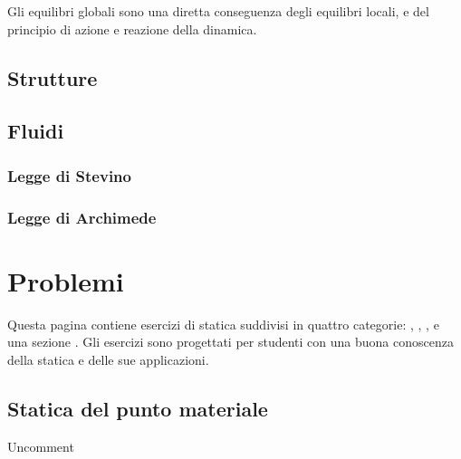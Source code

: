 \documentclass[letterpaper,10pt,italian]{jupyterBook}
\begin{document}
\sphinxAtStartPar
Gli equilibri globali sono una diretta conseguenza degli equilibri locali, e del principio di azione e reazione della dinamica.


\subsection{Strutture}
\label{\detokenize{ch/mechanics/statics-fluid:strutture}}

\subsection{Fluidi}
\label{\detokenize{ch/mechanics/statics-fluid:fluidi}}\label{\detokenize{ch/mechanics/statics-fluid:physics-hs-mechanics-statics-fluid-fluid}}

\subsubsection{Legge di Stevino}
\label{\detokenize{ch/mechanics/statics-fluid:legge-di-stevino}}\label{\detokenize{ch/mechanics/statics-fluid:physics-hs-mechanics-statics-fluid-stevino}}

\subsubsection{Legge di Archimede}
\label{\detokenize{ch/mechanics/statics-fluid:legge-di-archimede}}\label{\detokenize{ch/mechanics/statics-fluid:physics-hs-mechanics-statics-fluid-archimede}}
\sphinxstepscope


\section{Problemi}
\label{\detokenize{ch/mechanics/statics-problems:problemi}}\label{\detokenize{ch/mechanics/statics-problems:physics-hs-mechanics-statics-problems}}\label{\detokenize{ch/mechanics/statics-problems::doc}}
\sphinxAtStartPar
Questa pagina contiene esercizi di statica suddivisi in quattro categorie: , , , e una sezione . Gli esercizi sono progettati per studenti con una buona conoscenza della statica e delle sue applicazioni.


\subsection{Statica del punto materiale}
\label{\detokenize{ch/mechanics/statics-problems:statica-del-punto-materiale}}
\sphinxAtStartPar
Uncomment
\end{document}
